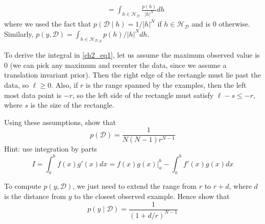 \begin{exercise}
\begin{align}
		&= \int_{h\in\mathcal{H_{\mathcal{D}}}}\frac{p(h)}{\lvert h\rvert^N}dh\label{ch2_eq1}
	\end{align}
	where we used the fact that \(p(\mathcal{D}\mid h) = 1 / \lvert h\rvert^N\) if \(h\in\mathcal{H_{\mathcal{D}}}\)
	and is \(0\) otherwise. Similarly, 
	\(p(y, \mathcal{D}) = \int_{h\in\mathcal{H}_{\mathcal{D}, y}}p(h) / \lvert h\rvert^Ndh\).
	\par\smallskip
	To derive the integral in \cref{ch2_eq1}, let us assume the maximum observed value is \(0\) (we can pick any
	maximum and recenter the data, since we assume a translation invariant prior). Then the right edge of the
	rectangle must lie past the data, so \(\ell\geq 0\). Also, if \(r\) is the range spanned by the examples, then the
	left most data point is \(-r\), so the left side of the rectangle must satisfy \(\ell - s\leq -r\), where \(s\) is the size
	of the rectangle.
	\begin{exercise}
	\item
		Using these assumptions, show that
		\[
			p(\mathcal{D}) = \frac{1}{N(N - 1)r^{N - 1}}
		\]
		Hint: use integration by parts
		\[
			I = \int_a^bf(x)g'(x)dx = f(x)g(x)\rvert_a^b - \int_a^bf'(x)g(x)dx
		\]
	\item
		To compute \(p(y, \mathcal{D})\), we just need to extend the range from \(r\) to \(r + d\), where \(d\) is the
		distance from \(y\) to the closest observed example. Hence show that
		\[
			p(y\mid\mathcal{D}) = \frac{1}{(1 + d/r)^{N - 1}}
		\]
	\end{exercise}
\end{exercise}

